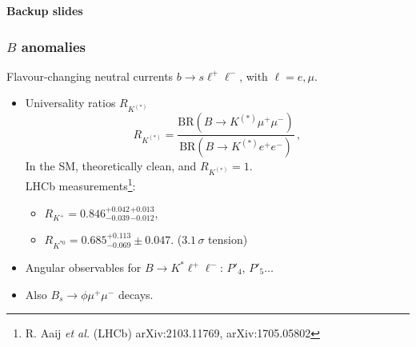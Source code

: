 \documentclass[mathserif, 10pt]{beamer}
\begin{document}
\begin{frame}[plain]
  \vspace{3cm}
  {\Large\bf\color{unizarblue} Backup slides}
\end{frame}

\begin{frame}
  \frametitle{$B$ anomalies}

  Flavour-changing neutral currents $b \to s \ell^+ \ell^-$, with $\ell = e, \mu$.
  \begin{itemize}
    \item Universality ratios $R_{K^{(*)}}$
          $$R_{K^{(*)}} = \frac{\mathrm{BR}(B\to K^{(*)}\mu^+ \mu^-)}{\mathrm{BR}(B\to K^{(*)}e^+ e^-)}\,, $$
          In the SM, theoretically clean, and $R_{K^{(*)}}=1$.\\
          LHCb measurements\footnote{R. Aaij \textit{et al.} (LHCb) arXiv:2103.11769, arXiv:1705.05802}:
          \begin{itemize}
            \item $R_{K^+} = 0.846^{+0.042}_{-0.039}{}^{+0.013}_{-0.012}$,
            \item $R_{K^{*0}} = 0.685^{+0.113}_{-0.069}\pm0.047$. ($3.1\,\sigma$ tension)
          \end{itemize}
    \item Angular observables for $B\to K^* \ell^+\ell^-$: $P'_4$, $P'_5\ldots$
    \item Also $B_s \to \phi \mu^+ \mu^-$ decays.
  \end{itemize}

\end{frame}
\end{document}

